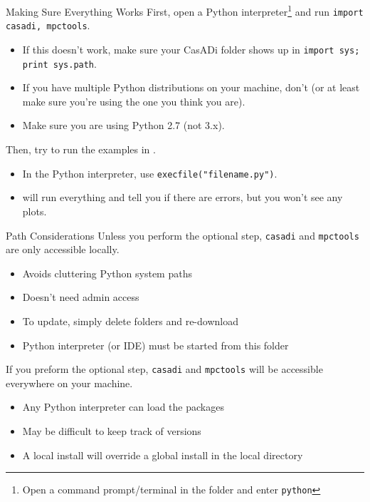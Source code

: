 \documentclass[xcolor=dvipsnames]{beamer}
\begin{document}
\begin{frame}{Making Sure Everything Works}
    First, open a Python interpreter\footnote{Open a command prompt/terminal in the  folder and enter \lstinline[style=shell]!python!} and run \lstinline[style=python]!import casadi, mpctools!.
    \begin{itemize}
        \item If this doesn't work, make sure your CasADi folder shows up in \lstinline[style=python]!import sys; print sys.path!.
        \item If you have multiple Python distributions on your machine, don't (or at least make sure you're using the one you think you are).
        \item Make sure you are using Python 2.7 (not 3.x).
    \end{itemize}
    
    \medskip
    
    Then, try to run the examples in .
    \begin{itemize}
        \item In the Python interpreter, use \lstinline[style=python]!execfile("filename.py")!.
        \item {} will run everything and tell you if there are errors, but you won't see any plots.
    \end{itemize}
\end{frame}

\begin{frame}{Path Considerations}
    Unless you perform the optional step, \texttt{casadi} and \texttt{mpctools} are only accessible locally.
    \begin{itemize}
        \item Avoids cluttering Python system paths
        \item Doesn't need admin access
        \item To update, simply delete folders and re-download
        \item Python interpreter (or IDE) must be started from this folder
    \end{itemize}
    
    \medskip
    
    If you preform the optional step, \texttt{casadi} and \texttt{mpctools} will be accessible everywhere on your machine.
    \begin{itemize}
        \item Any Python interpreter can load the packages
        \item May be difficult to keep track of versions
        \item A local install will override a global install in the local directory
    \end{itemize}
\end{frame}
\end{document}
